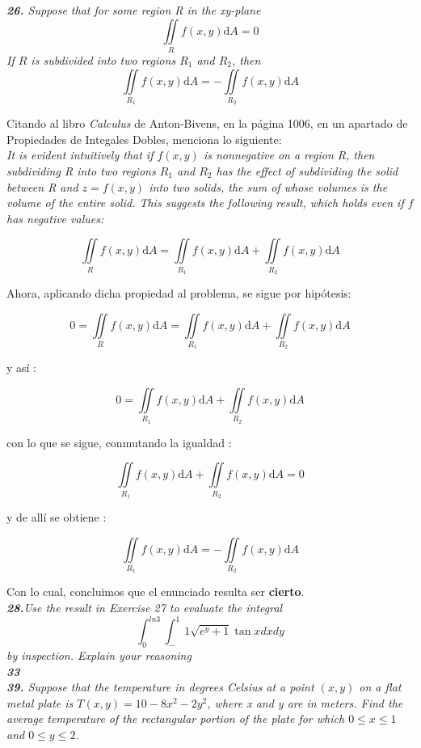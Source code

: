 \documentclass[a4paper,12pt]{article}
\begin{document}
	\textit{\textbf{26.} Suppose that for some region R in the xy-plane}
			$$ \iint\limits_{R} f(x,y)\mathrm{d}A = 0 $$
	\textit{ If $R$ is subdivided into two regions $R_1$ and $R_2$, then }
			$$ \iint\limits_{R_1} f(x,y)\mathrm{d}A = - \iint\limits_{R_2} f(x,y)\mathrm{d}A  $$

	Citando al libro \textit{Calculus} de Anton-Bivens, en la página 1006, en un
	apartado de Propiedades de Integales Dobles, menciona lo siguiente:\\

	\textit{It is evident intuitively that if $f(x, y)$ is nonnegative on a
	region R, then subdividing R into two regions $R_1$ and $R_2$ has the effect
	of subdividing the solid between R and $z = f (x , y)$ into two solids,
	the sum of whose volumes is the volume of the entire solid. This suggests
	the following result, which holds even if $f$ has negative values:}

		$$ \iint\limits_{R} f(x,y)\mathrm{d}A
			= \iint\limits_{R_1} f(x,y)\mathrm{d}A + \iint\limits_{R_2} f(x,y)\mathrm{d}A  $$

	Ahora, aplicando dicha propiedad al problema, se sigue por hipótesis:

		$$ 0 = \iint\limits_{R} f(x,y)\mathrm{d}A
			= \iint\limits_{R_1} f(x,y)\mathrm{d}A + \iint\limits_{R_2} f(x,y)\mathrm{d}A  $$

	y así :

		$$ 0 = \iint\limits_{R_1} f(x,y)\mathrm{d}A + \iint\limits_{R_2} f(x,y)\mathrm{d}A  $$

	con lo que se sigue, conmutando la igualdad :

		$$ \iint\limits_{R_1} f(x,y)\mathrm{d}A + \iint\limits_{R_2} f(x,y)\mathrm{d}A = 0$$

	y de allí se obtiene :

		$$ \iint\limits_{R_1} f(x,y)\mathrm{d}A = - \iint\limits_{R_2} f(x,y)\mathrm{d}A $$

	Con lo cual, concluimos que el enunciado resulta ser \textbf{cierto}.\\

	\textit{\textbf{28.}Use the result in Exercise 27 to evaluate the integral
	\[\int^{ln 3}_{0} \int^1_-1 \sqrt{e^y + 1}\tan x dx dy\]
	by inspection. Explain your reasoning}\ \\

	\textit{\textbf{33}}\\

	\textit{\textbf{39.} Suppose that the temperature in degrees Celsius at a
	point $(x,y)$ on a flat metal plate is $ T(x,y)=10 - 8x^2 - 2y^2$, where x
	and y are in meters. Find the average temperature of the rectangular portion
	of the plate for which $0 \leq x \leq 1$ and $0 \leq y \leq 2$.}\\
\end{document}
